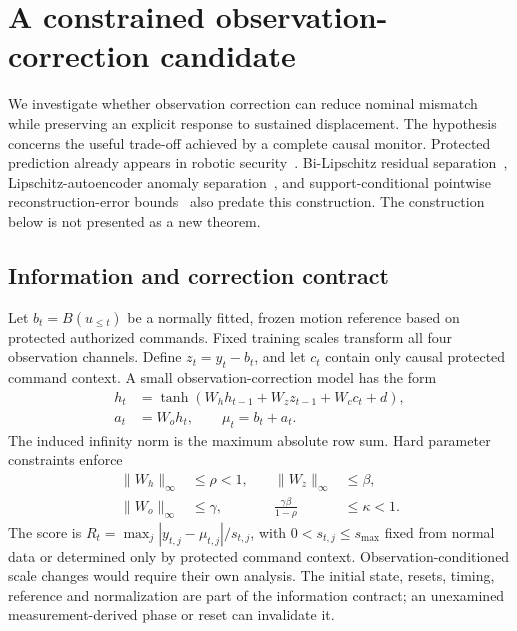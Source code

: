 \section{A constrained observation-correction candidate}\label{sec:gain}
We investigate whether observation correction can reduce nominal mismatch while preserving an explicit response to sustained displacement. The hypothesis concerns the useful trade-off achieved by a complete causal monitor. Protected prediction already appears in robotic security~\cite{robotactive}. Bi-Lipschitz residual separation~\cite{iresnet}, Lipschitz-autoencoder anomaly separation~\cite{lipschitzauto}, and support-conditional pointwise reconstruction-error bounds~\cite{diffint} also predate this construction. The construction below is not presented as a new theorem.

\subsection{Information and correction contract}
Let $b_t=B(u_{\leq t})$ be a normally fitted, frozen motion reference based on protected authorized commands. Fixed training scales transform all four observation channels. Define $z_t=y_t-b_t$, and let $c_t$ contain only causal protected command context. A small observation-correction model has the form
\begin{align}
 h_t&=\tanh(W_hh_{t-1}+W_zz_{t-1}+W_cc_t+d),\label{eq:gainstate}\\
 a_t&=W_oh_t,\qquad \mu_t=b_t+a_t.
\end{align}
The induced infinity norm is the maximum absolute row sum. Hard parameter constraints enforce
\begin{equation}
 \begin{aligned}
 \|W_h\|_\infty&\leq\rho<1,&\quad \|W_z\|_\infty&\leq\beta,\\
 \|W_o\|_\infty&\leq\gamma,&\quad \frac{\gamma\beta}{1-\rho}&\leq\kappa<1.
 \end{aligned}
 \label{eq:gainconstraints}
\end{equation}
The score is $R_t=\max_j |y_{t,j}-\mu_{t,j}|/s_{t,j}$, with $0<s_{t,j}\leq s_{\max}$ fixed from normal data or determined only by protected command context. Observation-conditioned scale changes would require their own analysis. The initial state, resets, timing, reference and normalization are part of the information contract; an unexamined measurement-derived phase or reset can invalidate it.

